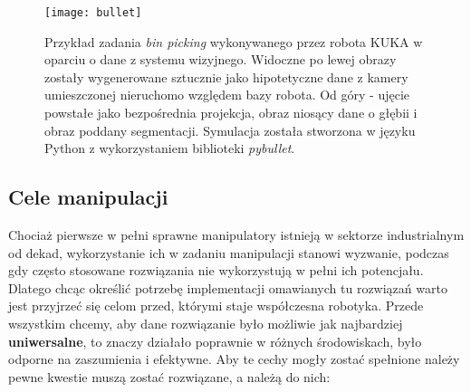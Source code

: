 \documentclass{article}
\begin{document}
\begin{figure}[h]
\texttt{[image: bullet]}
\caption{Przykład zadania \emph{bin picking} wykonywanego przez robota KUKA w oparciu o dane z systemu wizyjnego. Widoczne po lewej obrazy zostały wygenerowane sztucznie jako hipotetyczne dane z kamery umieszczonej nieruchomo względem bazy robota. Od góry - ujęcie powstałe jako bezpośrednia projekcja, obraz niosący dane o głębii i obraz poddany segmentacji. Symulacja została stworzona w języku Python z wykorzystaniem biblioteki \emph{pybullet}.}
\end{figure}

\subsection*{\LARGE{Cele manipulacji}} 

Chociaż pierwsze w pełni sprawne manipulatory istnieją w sektorze industrialnym od dekad, wykorzystanie ich w zadaniu manipulacji stanowi wyzwanie, podczas gdy często stosowane rozwiązania nie wykorzystują w pełni ich potencjału. Dlatego chcąc określić potrzebę implementacji omawianych tu rozwiązań warto jest przyjrzeć się celom przed, którymi staje współczesna robotyka. Przede wszystkim chcemy, aby dane rozwiązanie było możliwie jak najbardziej \textbf{uniwersalne}, to znaczy działało poprawnie w różnych środowiskach, było odporne na zaszumienia i efektywne. Aby te cechy mogły zostać spełnione należy pewne kwestie muszą zostać rozwiązane, a należą do nich:
\end{document}

